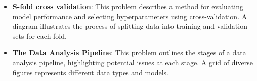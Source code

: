 \documentclass{article}%
\begin{document}
\begin{itemize}[leftmargin=*]
\item \href{https://purdue.brightspace.com/d2l/common/assets/pdfjs-d2l-dist/1.0.14-legacy/web/viewer.html?file=\%2Fcontent\%2Fenforced\%2F1095467-wl.202510.CS.24300.001\%2F10L1-CrossValidation.pdf\%3Fou\%3D1095467\&lang=en-us\&container=d2l-fileviewer-rendered-pdf\&fullscreen=d2l-fileviewer-rendered-pdf-dialog\&height=667#page=25}{\textbf{S{-}fold cross validation}}: This problem describes a method for evaluating model performance and selecting hyperparameters using cross-validation. A diagram illustrates the process of splitting data into training and validation sets for each fold.%
\item \href{https://purdue.brightspace.com/d2l/common/assets/pdfjs-d2l-dist/1.0.14-legacy/web/viewer.html?file=\%2Fcontent\%2Fenforced\%2F1095467-wl.202510.CS.24300.001\%2F10L1-CrossValidation.pdf\%3Fou\%3D1095467\&lang=en-us\&container=d2l-fileviewer-rendered-pdf\&fullscreen=d2l-fileviewer-rendered-pdf-dialog\&height=667#page=26}{\textbf{The Data Analysis Pipeline}}: This problem outlines the stages of a data analysis pipeline, highlighting potential issues at each stage. A grid of diverse figures represents different data types and models.%
\end{itemize}%
\end{document}
